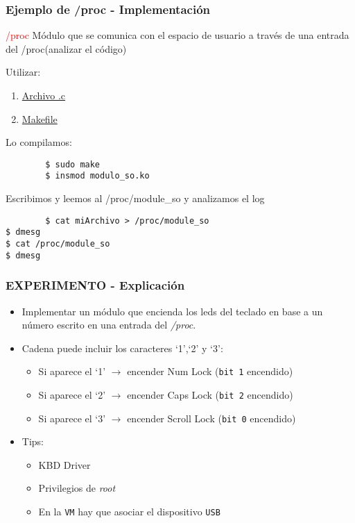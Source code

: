 \begin{frame}[fragile]
\frametitle{Ejemplo de /proc - Implementación}

      \begin{block}{\textcolor{red}{/proc}}
           Módulo que se comunica con el espacio de usuario a través de una entrada del /proc(analizar el código)
       \end{block} 

  
    Utilizar:
       \begin{enumerate}
          \item \href{https://github.com/colo76/kernel-programming/blob/master/proc_dir/modulo_so.c}{Archivo .c}
          \item \href{https://github.com/unlp-so/contenidos/blob/master/explicaciones/so/practica3/experiment/Makefile}{Makefile}
       \end{enumerate}
	Lo compilamos:
		\begin{lstlisting}
		$ sudo make
		$ insmod modulo_so.ko
		\end{lstlisting}

		Escribimos y leemos al /proc/module\_so y analizamos el log
           	\begin{lstlisting}
		$ cat miArchivo > /proc/module_so
$ dmesg
$ cat /proc/module_so
$ dmesg
		\end{lstlisting}
               


\end{frame}



\begin{frame}
\frametitle{EXPERIMENTO - Explicación}
   \begin{itemize}  
   \item Implementar un módulo que encienda los leds del teclado en base a un número escrito en una entrada del \emph{/proc}.
   \item Cadena puede incluir los caracteres ‘1’,‘2’ y ‘3’:
   \begin{itemize}
      \item Si aparece el ‘1’ $\rightarrow$ encender Num Lock (\texttt{bit 1} encendido)
      \item Si aparece el ‘2’ $\rightarrow$ encender Caps Lock (\texttt{bit 2} encendido)
      \item Si aparece el ‘3’ $\rightarrow$ encender Scroll Lock (\texttt{bit 0} encendido)
    \end{itemize}
   \item Tips:
   \begin{itemize}     
      \item KBD Driver
      \item Privilegios de \emph{root}
      \item En la \texttt{VM} hay que asociar el dispositivo \texttt{USB}
    \end{itemize}
 \end{itemize}
\end{frame}

